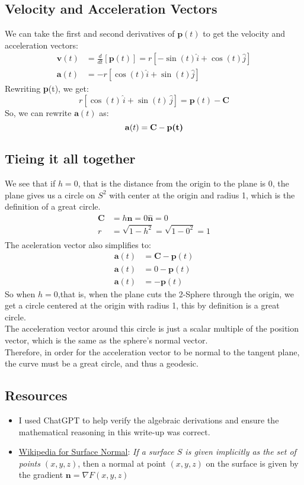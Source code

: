 \documentclass[11pt]{article}
\begin{document}
\subsection*{Velocity and Acceleration Vectors}
We can take the first and second derivatives of $\textbf{p}(t)$ to get the velocity and acceleration vectors:
\begin{align*}
    \mathbf{v}(t) & = \frac{d}{dt} \left[\textbf{p}(t)\right] =  r\left[-\sin(t) \hat{i} + \cos(t) \hat{j} \right] \\
    \mathbf{a}(t) & = -r[\cos(t)\hat{i} + \sin(t)\hat{j}]
\end{align*}
Rewriting \textbf{p}(t), we get:
$$r[\cos(t)\,\hat{i} + \sin(t)\,\hat{j}] = \textbf{p}(t) - \mathbf{C}$$
So, we can rewrite $\mathbf{a}(t)$ as:
$$\mathbf{a}(t) = \mathbf{C} - \textbf{\textbf{p}(t)}$$
\newpage
\subsection*{Tieing it all together}
We see that if $h = 0$, that is the distance from the origin to the plane is 0, the plane gives us a circle on $S^2$ with center at the origin and radius 1, which is the definition of a great circle.
\begin{align*}
    \mathbf{C} & = h \hat{\textbf{n}} = 0 \hat{\textbf{n}} = 0 \\[1ex]
    r          & = \sqrt{1- h^2} = \sqrt{1- 0^2} = 1           \\
\end{align*}
The aceleration vector also simplifies to:
\begin{align*}
    \mathbf{a}(t) & = \mathbf{C} - \textbf{p}(t) \\
    \mathbf{a}(t) & = 0 - \textbf{p}(t)          \\
    \mathbf{a}(t) & = - \textbf{p}(t)
\end{align*}
So when $h = 0$,that is, when the plane cuts the 2-Sphere through the origin, we get a circle centered at the origin with radius 1, this by definition is a great circle. \\
The acceleration vector around this circle is just a scalar multiple of the position vector, which is the same as the sphere's normal vector. \\
Therefore, in order for the acceleration vector to be normal to the tangent plane, the curve must be a great circle, and thus a geodesic.
\pagebreak
\subsection*{Resources}
\begin{itemize}
    \item I used ChatGPT to help verify the algebraic derivations and ensure the mathematical reasoning in this write-up was correct.
    \item \href{https://www.wikiwand.com/en/articles/Normal_(geometry)}{Wikipedia for Surface Normal}:
          \textit {If a surface $S$ is given implicitly as the set of points  $(x,y,z)$}, then a normal at point $(x,y,z)$ on the surface is given by the gradient $\textbf{n} = \nabla F(x,y,z)$
\end{itemize}
\end{document}

